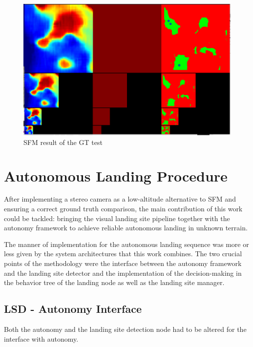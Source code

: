 \begin{figure}[ht]
\centering
\includegraphics[scale=0.22]{images/methodology/SFM.png}
\caption{SFM result of the GT test}
\label{fig:gt_test_sfm}
\end{figure} 



\clearpage %
\section{Autonomous Landing Procedure}

After implementing a stereo camera as a low-altitude alternative to SFM and ensuring a correct ground truth comparison, the main contribution of this work could be tackled: bringing the visual landing site pipeline together with the autonomy framework to achieve reliable autonomous landing in unknown terrain.

The manner of implementation for the autonomous landing sequence was more or less given by the system architectures that this work combines. The two crucial points of the methodology were the interface between the autonomy framework and the landing site detector and the implementation of the decision-making in the behavior tree of the landing node as well as the landing site manager.

\subsection{LSD - Autonomy Interface}

Both the autonomy and the landing site detection node had to be altered for the interface with autonomy.

